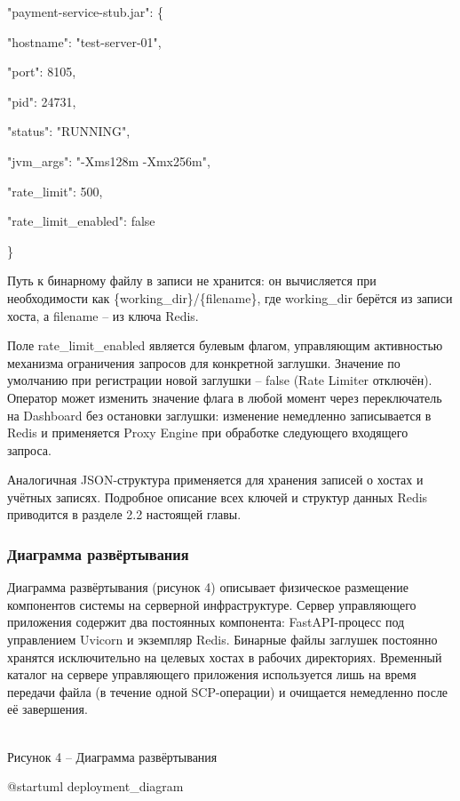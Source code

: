 \documentclass[
]{article}
\begin{document}
"payment-service-stub.jar": \{

"hostname": "test-server-01",

"port": 8105,

"pid": 24731,

"status": "RUNNING",

"jvm\_args": "-Xms128m -Xmx256m",

"rate\_limit": 500,

"rate\_limit\_enabled": false

\}

Путь к бинарному файлу в записи не хранится: он вычисляется при
необходимости как \{working\_dir\}/\{filename\}, где working\_dir
берётся из записи хоста, а filename -- из ключа Redis.

Поле rate\_limit\_enabled является булевым флагом, управляющим
активностью механизма ограничения запросов для конкретной заглушки.
Значение по умолчанию при регистрации новой заглушки -- false (Rate
Limiter отключён). Оператор может изменить значение флага в любой момент
через переключатель на Dashboard без остановки заглушки: изменение
немедленно записывается в Redis и применяется Proxy Engine при обработке
следующего входящего запроса.

Аналогичная JSON-структура применяется для хранения записей о хостах и
учётных записях. Подробное описание всех ключей и структур данных Redis
приводится в разделе 2.2 настоящей главы.

\subsubsection{Диаграмма
развёртывания}\label{ux434ux438ux430ux433ux440ux430ux43cux43cux430-ux440ux430ux437ux432ux451ux440ux442ux44bux432ux430ux43dux438ux44f}

Диаграмма развёртывания (рисунок 4) описывает физическое размещение
компонентов системы на серверной инфраструктуре. Сервер управляющего
приложения содержит два постоянных компонента: FastAPI-процесс под
управлением Uvicorn и экземпляр Redis. Бинарные файлы заглушек постоянно
хранятся исключительно на целевых хостах в рабочих директориях.
Временный каталог на сервере управляющего приложения используется лишь
на время передачи файла (в течение одной SCP-операции) и очищается
немедленно после её завершения.

\\
Рисунок 4 -- Диаграмма развёртывания

@startuml deployment\_diagram
\end{document}
